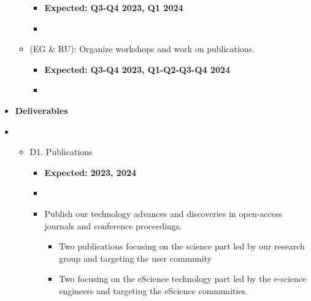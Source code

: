 \begin{enumerate}[start=0,label={\bfseries \ding{118} Task \arabic*:}]
\begin{itemize}
\begin{itemize}
\item \textbf{Expected: Q3-Q4 2023, Q1 2024}
\item {}
\end{itemize}
\item (EG \& RU): Organize workshops and work on publications.
\begin{itemize}
\item \textbf{Expected: Q3-Q4 2023, Q1-Q2-Q3-Q4 2024}
\item {}
\end{itemize}
\end{itemize}
\end{enumerate}



\begin{itemize}
\item \textbf{Deliverables}
\end{itemize}



\begin{itemize}
\item \begin{itemize}
\item D1. Publications
\begin{itemize}
\item \textbf{Expected: 2023, 2024}
\item {}
\item Publish our technology advances and discoveries in open-access journals and conference proceedings.
\begin{itemize}
\item Two publications focusing on the science part led by our research group and targeting the user community
\item Two focusing on the eScience technology part led by the e-science engineers and targeting the eScience communities.
\end{itemize}
\end{itemize}
\end{itemize}
\end{itemize}



